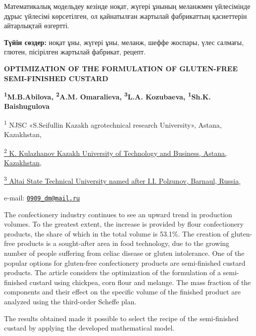 Математикалық модельдеу кезінде ноқат, жүгері ұнының меланжмен
үйлесімінде дұрыс үйлесімі көрсетілген, ол қайнатылған жартылай
фабрикаттың қасиеттерін айтарлықтай өзгертті.

{\bfseries Түйін сөздер:} ноқат ұны, жүгері ұны, меланж, шеффе жоспары,
үлес салмағы, глютен, пісірілген жартылай фабрикат, рецепт.

\begin{articleheader}
{\bfseries OPTIMIZATION OF THE FORMULATION OF GLUTEN-FREE SEMI-FINISHED
CUSTARD}

{\bfseries \textsuperscript{1}M.B.Abilova\textsuperscript{\envelope },
\textsuperscript{2}A.M. Omaralieva, \textsuperscript{3}L.A. Kozubaeva,
\textsuperscript{1}Sh.K. Baishugulova}
\end{articleheader}

\begin{affiliation}
\textsuperscript{1} NJSC «S.Seifullin Kazakh agrotechnical research
University», Astana, Kazakhstan,

\href{https://bankchart.kz/spravochniki/pochtovyye_indeksy/id/116470}{\textsuperscript{2}
K. Kulazhanov Kazakh University of Technology and Business, Astana,
Kazakhstan,}

\href{https://bankchart.kz/spravochniki/pochtovyye_indeksy/id/116470}{\textsuperscript{3}
Altai State Technical University named after I.I. Polzunov, Barnaul,
Russia},

e-mail: \href{mailto:0909_dm@mail.ru}{\nolinkurl{0909\_dm@mail.ru}}
\end{affiliation}

The confectionery industry continues to see an upward trend in
production volumes. To the greatest extent, the increase is provided by
flour confectionery products, the share of which in the total volume is
53.1\%. The creation of gluten-free products is a sought-after area in
food technology, due to the growing number of people suffering from
celiac disease or gluten intolerance. One of the popular options for
gluten-free confectionery products are semi-finished custard products.
The article considers the optimization of the formulation of a
semi-finished custard using chickpea, corn flour and melange. The mass
fraction of the components and their effect on the specific volume of
the finished product are analyzed using the third-order Scheffe plan.

The results obtained made it possible to select the recipe of the
semi-finished custard by applying the developed mathematical model.


